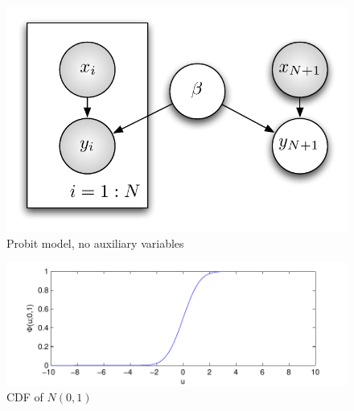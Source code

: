 
\begin{figure}[htbp]
\begin{center}
\includegraphics{Chapters/chapter1/probit_no_aux_vars}
\caption{Probit model, no auxiliary variables}
\label{fig:probit_no_aux_vars}
\end{center}
\end{figure}


\begin{figure}[htbp]
\begin{center}
\includegraphics{Chapters/chapter1/cdf}
\caption{CDF of $N(0,1)$}
\label{fig:cdf}
\end{center}
\end{figure}

